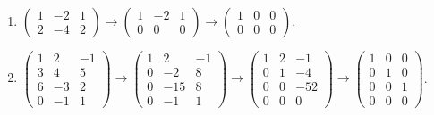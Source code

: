 	 \paragraph{} %
		 \begin{enumerate}
			 \item %
			       $\begin{pmatrix}
					       1 & -2 & 1 \\
					       2 & -4 & 2
				       \end{pmatrix} \to \begin{pmatrix}
					       1 & -2 & 1 \\
					       0 & 0  & 0
				       \end{pmatrix} \to \begin{pmatrix}
					       1 & 0 & 0 \\
					       0 & 0 & 0
				       \end{pmatrix}$.

			 \item %
			       $\begin{pmatrix}
					       1 & 2  & -1 \\
					       3 & 4  & 5  \\
					       6 & -3 & 2  \\
					       0 & -1 & 1
				       \end{pmatrix} \to \begin{pmatrix}
					       1 & 2   & -1 \\
					       0 & -2  & 8  \\
					       0 & -15 & 8  \\
					       0 & -1  & 1
				       \end{pmatrix} \to \begin{pmatrix}
					       1 & 2 & -1  \\
					       0 & 1 & -4  \\
					       0 & 0 & -52 \\
					       0 & 0 & 0
				       \end{pmatrix} \to \begin{pmatrix}
					       1 & 0 & 0 \\
					       0 & 1 & 0 \\
					       0 & 0 & 1 \\
					       0 & 0 & 0
				       \end{pmatrix}$.
		 \end{enumerate}


